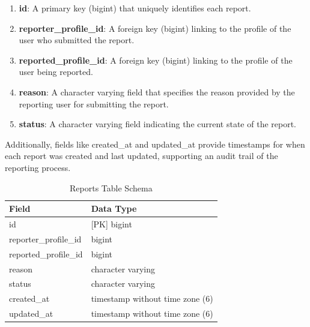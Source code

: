 \begin{enumerate}
    \begin{enumerate}
    \item \textbf{id}: A primary key (bigint) that uniquely identifies each report.
    \item \textbf{reporter\_profile\_id}: A foreign key (bigint) linking to the profile of the user who submitted the report.
    \item \textbf{reported\_profile\_id}: A foreign key (bigint) linking to the profile of the user being reported.
    \item \textbf{reason}: A character varying field that specifies the reason provided by the reporting user for submitting the report.
    \item \textbf{status}: A character varying field indicating the current state of the report.
    \end{enumerate}
    
    \bigskip Additionally, fields like created\_at and updated\_at provide timestamps for when each report was created and last updated, supporting an audit trail of the reporting process.
    
    \begin{table}[h!]
    \captionsetup{justification=centering, singlelinecheck=false, labelsep=space}
    \centering
    \begin{tabular}{ll} %
    \hline
    \textbf{Field}               & \textbf{Data Type}                 \\ \hline
    id                           & [PK] bigint                        \\ 
    reporter\_profile\_id        & bigint                             \\ 
    reported\_profile\_id        & bigint                             \\ 
    reason                       & character varying                  \\ 
    status                       & character varying                  \\ 
    created\_at                  & timestamp without time zone (6)    \\ 
    updated\_at                  & timestamp without time zone (6)    \\ \hline
    \end{tabular}
    \caption{Reports Table Schema} %
    \label{tab:Reports Table Schema}
    \end{table}


\end{enumerate}
